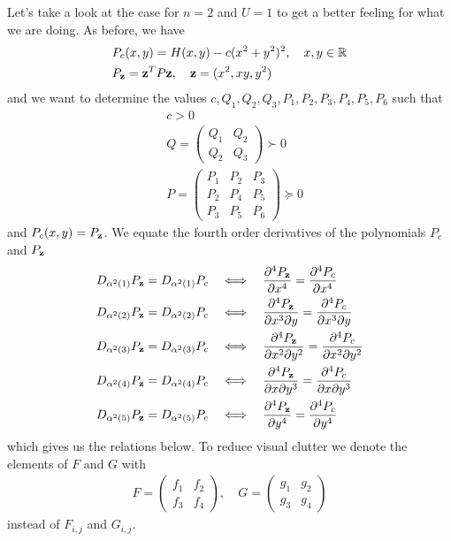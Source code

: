 \documentclass[a4paper,12pt,twoside,BCOR=10mm]{scrbook}
\begin{document}
Let's take a look at the case for $n = 2$ and $U = 1$ to get a better feeling for what we are doing. As before, we have
\begin{align*}
    &P_c(x, y) = H(x,y) - c(x^2 + y^2)^2, \quad x,y\in\mathbb{R}^{}\\
    &P_{\mathbf{z}} = \mathbf{z}^T P \mathbf{z}, \quad \mathbf{z} = (x^2, xy, y^2)
\end{align*}
and we want to determine the values $c, Q_1, Q_2,Q_3, P_1, P_2, P_3, P_4, P_5, P_6$ such that
\begin{align*}
    &c > 0\\
    &Q = \begin{pmatrix}
    Q_1 & Q_2\\
    Q_2 & Q_3
    \end{pmatrix}
    \succ 0\\
    &P = \begin{pmatrix}
    P_1 & P_2 & P_3\\
    P_2 & P_4 & P_5\\
    P_3 & P_5 & P_6
    \end{pmatrix}
    \succeq 0
\end{align*}
and $P_c(x ,y) = P_{\mathbf{z}}$. We equate the fourth order derivatives of the polynomials $P_c$ and $P_{\mathbf{z}}$
\begin{align}\label{RelationsSpecialCase}
    &D_{\alpha^2(1)} P_{\mathbf{z}} = D_{\alpha^2(1)} P_c \quad \Longleftrightarrow \quad \frac{\partial^4 P_{\mathbf{z}}}{\partial x^4} = \frac{\partial^4 P_c}{\partial x^4} \nonumber\\
    &D_{\alpha^2(2)} P_{\mathbf{z}} = D_{\alpha^2(2)} P_c \quad \Longleftrightarrow \quad \frac{\partial^4 P_{\mathbf{z}}}{\partial x^3 \partial y} = \frac{\partial^4 P_c}{\partial x^3 \partial y}\nonumber\\
    &D_{\alpha^2(3)} P_{\mathbf{z}} = D_{\alpha^2(3)} P_c \quad \Longleftrightarrow \quad \frac{\partial^4 P_{\mathbf{z}}}{\partial x^2 \partial y^2} = \frac{\partial^4 P_c}{\partial x^2 \partial y^2}\\
    &D_{\alpha^2(4)} P_{\mathbf{z}} = D_{\alpha^2(4)} P_c \quad \Longleftrightarrow \quad \frac{\partial^4 P_{\mathbf{z}}}{\partial x \partial y^3} = \frac{\partial^4 P_c}{\partial x \partial y^3}\nonumber\\
    &D_{\alpha^2(5)} P_{\mathbf{z}} = D_{\alpha^2(5)} P_c \quad \Longleftrightarrow \quad \frac{\partial^4 P_{\mathbf{z}}}{\partial y^4} = \frac{\partial^4 P_c}{\partial y^4}\nonumber
\end{align}
which gives us the relations below. To reduce visual clutter we denote the elements of $F$ and $G$ with
\begin{align*}
    F = \begin{pmatrix}
    f_1 & f_2\\
    f_3 & f_4
    \end{pmatrix}
    , \quad
    G = \begin{pmatrix}
    g_1 & g_2\\
    g_3 & g_4
    \end{pmatrix}
\end{align*}
instead of $F_{i,j}$ and $G_{i,j}$.
\end{document}
